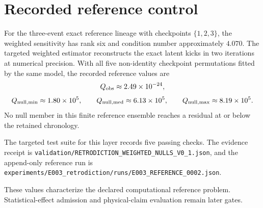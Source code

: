 \section{Recorded reference control}

For the three-event exact reference lineage with checkpoints $\{1,2,3\}$, the weighted sensitivity has rank six and condition number approximately $4.070$. The targeted weighted estimator reconstructs the exact latent kicks in two iterations at numerical precision. With all five non-identity checkpoint permutations fitted by the same model, the recorded reference values are
\[
Q_{\rm obs}\approx2.49\times10^{-24},
\]
\[
Q_{\rm null,min}\approx1.80\times10^5,
\qquad
Q_{\rm null,med}\approx6.13\times10^5,
\qquad
Q_{\rm null,max}\approx8.19\times10^5.
\]
No null member in this finite reference ensemble reaches a residual at or below the retained chronology.

The targeted test suite for this layer records five passing checks. The evidence receipt is
\texttt{validation/RETRODICTION\_WEIGHTED\_NULLS\_V0\_1.json},
and the append-only reference run is
\texttt{experiments/E003\_retrodiction/runs/E003\_REFERENCE\_0002.json}.

These values characterize the declared computational reference problem. Statistical-effect admission and physical-claim evaluation remain later gates.
